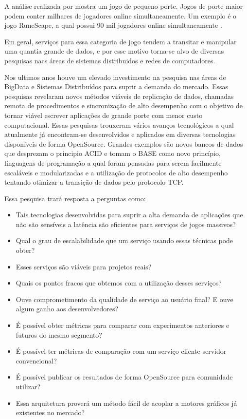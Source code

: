 A análise realizada por \cite{system_performance} mostra um jogo de pequeno porte. Jogos de porte maior podem conter milhares de jogadores online simultaneamente. Um exemplo é o jogo RuneScape, a qual possui 90 mil jogadores online simultaneamente \cite{runescape_online_users}.

Em geral, serviços para essa categoria de jogo tendem a transitar e manipular uma quantia grande de dados, e por esse motivo torna-se alvo de diversas pesquisas nacs áreas de sistemas distribuidos e redes de computadores.

Nos ultimos anos houve um elevado investimento na pesquisa nas áreas de BigData e Sistemas Distribuídos para suprir a demanda do mercado. Essas pesquisas revelaram novos métodos viáveis de replicação de dados, chamadas remota de procedimentos e sincronização de alto desempenho com o objetivo de tornar viável escrever aplicações de grande porte com menor custo computacional. Essas pesquisas trouxeram vários avanços tecnológicos a qual atualmente já encontram-se desenvolvidos e aplicados em diversas tecnologias disponíveis de forma OpenSource. Grandes exemplos são novos bancos de dados que desprezam o principio ACID e tomam o BASE como novo princípio, linguagens de programação a qual foram pensadas para serem facilmente escaláveis e modularizadas e a utilização de protocolos de alto desempenho tentando otimizar a transição de dados pelo protocolo TCP.

Essa pesquisa trará resposta a perguntas como:

\begin{itemize}
  \item Tais tecnologias desenvolvidas para suprir a alta demanda de aplicações que não são sensíveis a latência são eficientes para serviços de jogos massivos?
  \item Qual o grau de escalabilidade que um serviço usando essas técnicas pode obter?
  \item Esses serviços são viáveis para projetos reais?
  \item Quais os pontos fracos que obtemos com a utilização desses serviços?
  \item Ouve comprometimento da qualidade de serviço ao usuário final? E ouve algum ganho aos desenvolvedores?
  \item É possível obter métricas para comparar com experimentos anteriores e futuros do mesmo segmento?
  \item É possível ter métricas de comparação com um serviço cliente servidor convencional?
  \item É possível publicar os resultados de forma OpenSource para comunidade utilizar?
  \item Essa arquitetura proverá um método fácil de acoplar a motores gráficos já existentes no mercado?
\end{itemize}
